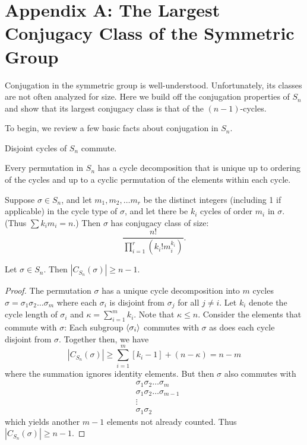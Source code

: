 \documentclass[main.tex]{subfiles}
\begin{document}
\chapter{Appendix A: The Largest Conjugacy Class of the Symmetric Group}

Conjugation in the symmetric group is well-understood. Unfortunately, its classes are not often analyzed for size. Here we build off the conjugation properties of $S_n$ and show that its largest conjugacy class is that of the $(n-1)$-cycles.

To begin, we review a few basic facts about conjugation in $S_n$.

\begin{theorem}
Disjoint cycles of $S_n$ commute.
\end{theorem}

\begin{theorem}
Every permutation in $S_n$ has a cycle decomposition that is unique up to ordering of the cycles and up to a cyclic permutation of the elements within each cycle.
\end{theorem}

\begin{theorem}\label{permutationclasssize}
Suppose $\sigma \in S_n$, and let $m_1, m_2, \ldots m_r$ be the distinct integers (including 1 if applicable) in the cycle type of $\sigma$, and let there be $k_i$ cycles of order $m_i$ in $\sigma$. (Thus $\sum k_i m_i = n$.) Then $\sigma$ has conjugacy class of size:
$$\frac{n!}{\prod_{i=1}^r (k_i!m_i^{k_i})}\text{.}$$
\end{theorem}

\begin{theorem}\label{permutationcentralizer}
Let $\sigma \in S_n$. Then $|C_{S_n}(\sigma)| \ge n - 1$.
\end{theorem}

\begin{proof}
The permutation $\sigma$ has a unique cycle decomposition into $m$ cycles $\sigma = \sigma_1 \sigma_2 \ldots \sigma_m$ where each $\sigma_i$ is disjoint from $\sigma_j$ for all $j \ne i$. Let $k_i$ denote the cycle length of $\sigma_i$ and $\kappa = \sum_{i = 1}^m k_i$. Note that $\kappa \le n$. Consider the elements that commute with $\sigma$: Each subgroup $\langle \sigma_i \rangle$ commutes with $\sigma$ as does each cycle disjoint from $\sigma$. Together then, we have
$$|C_{S_n}(\sigma)| \ge \sum_{i=1}^m [k_i - 1] + (n - \kappa) = n - m$$
where the summation ignores identity elements. But then $\sigma$ also commutes with
\begin{align*}
&\sigma_1 \sigma_2 \ldots \sigma_m \\
&\sigma_1 \sigma_2 \ldots \sigma_{m-1} \\
&\vdots \\
&\sigma_1 \sigma_2
\end{align*}
which yields another $m-1$ elements not already counted. Thus $|C_{S_n}(\sigma)| \ge n-1$.
\end{proof}
\end{document}
